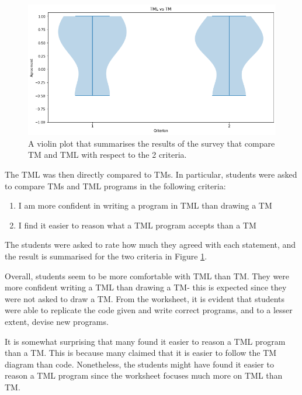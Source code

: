 \begin{figure}[htb]
    \centering
    \includegraphics[scale=0.35]{images/tml-v-tm.png}
    \caption{A violin plot that summarises the results of the survey that compare TM and TML with respect to the 2 criteria.}
    \label{fig:tml-v-tm}
\end{figure}

The TML was then directly compared to TMs. In particular, students were asked to compare TMs and TML programs in the following criteria:
\begin{enumerate}
    \item I am more confident in writing a program in TML than drawing a TM
    \item I find it easier to reason what a TML program accepts than a TM
\end{enumerate}
The students were asked to rate how much they agreed with each statement, and the result is summarised for the two criteria in Figure \ref{fig:tml-v-tm}. 

Overall, students seem to be more comfortable with TML than TM. They were more confident writing a TML than drawing a TM- this is expected since they were not asked to draw a TM. From the worksheet, it is evident that students were able to replicate the code given and write correct programs, and to a lesser extent, devise new programs.

It is somewhat surprising that many found it easier to reason a TML program than a TM. This is because many claimed that it is easier to follow the TM diagram than code. Nonetheless, the students might have found it easier to reason a TML program since the worksheet focuses much more on TML than TM.

